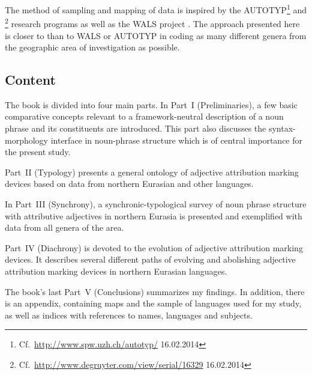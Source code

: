 The method of sampling and mapping of data is inspired by the \textsc{AUTOTYP}\footnote{Cf.~\url{http://www.spw.uzh.ch/autotyp/} 16.02.2014} and \textsc{}\footnote{Cf.~\url{http://www.degruyter.com/view/serial/16329} 16.02.2014} research programs as well as the \textsc{WALS} project \citep{walsOnline2013}. The approach presented here is closer to \textsc{} than to \textsc{WALS} or \textsc{AUTOTYP} in coding as many different genera from the geographic area of investigation as possible.

\subsection*{Content}
The book is divided into four main parts. In Part~I (Preliminaries), a few basic comparative concepts relevant to a framework-neutral description of a noun phrase and its constituents are introduced. This part also discusses the syntax-morphology interface in noun-phrase structure which is of central importance for the present study.

Part~II (Typology) presents a general ontology of adjective attribution marking devices based on data from northern Eurasian and other languages.

In Part~III (Synchrony), a synchronic-typological survey of noun phrase structure with attributive adjectives in northern Eurasia is presented and exemplified with data from all genera of the area.

Part~IV (Diachrony) is devoted to the evolution of adjective attribution marking devices. It describes several different paths of evolving and abolishing adjective attribution marking devices in northern Eurasian languages.

The book's last Part~V (Conclusions) summarizes my findings. In addition, there is an appendix, containing maps and the sample of languages used for my study, as well as indices with references to names, languages and subjects.

